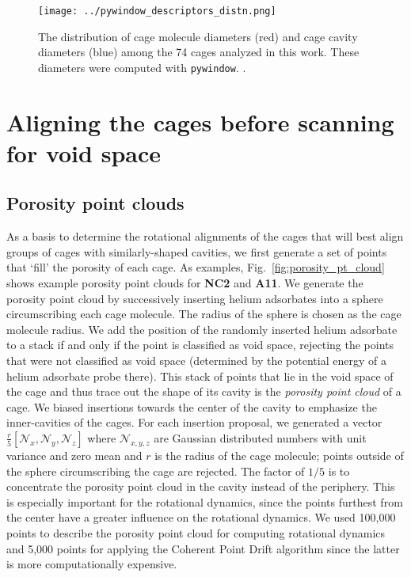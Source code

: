 \documentclass[journal=jacsat,manuscript=article]{achemso}
\begin{document}
\begin{figure}
\centering
	\texttt{[image: ../pywindow\_descriptors\_distn.png]}
	\caption{The distribution of cage molecule diameters (red) and cage cavity diameters (blue) among the 74 cages analyzed in this work. These diameters were computed with \texttt{pywindow}. \cite{miklitz2018pywindow}.
	} \label{fig:pywindow_descriptors_distn}
\end{figure}

\newpage
\clearpage

\section{Aligning the cages before scanning for void space} 

{\color{red}
\subsection{Porosity point clouds}
\label{sec:porosity_pt_cld}
As a basis to determine the rotational alignments of the cages that will best align groups of cages with similarly-shaped cavities, we first generate a set of points that `fill' the porosity of each cage. As examples, Fig.~\ref{fig:porosity_pt_cloud} shows example porosity point clouds for \textbf{NC2} and \textbf{A11}. We generate the porosity point cloud by successively inserting helium adsorbates into a sphere circumscribing each cage molecule. The radius of the sphere is chosen as the cage molecule radius. We add the position of the randomly inserted helium adsorbate to a stack if and only if the point is classified as void space, rejecting the points that were not classified as void space (determined by the potential energy of a helium adsorbate probe there). This stack of points that lie in the void space of the cage and thus trace out the shape of its cavity is the \emph{porosity point cloud} of a cage. We biased insertions towards the center of the cavity to emphasize the inner-cavities of the cages. For each insertion proposal, we generated a vector $\frac{r}{5}[\mathcal{N}_x,\mathcal{N}_y,\mathcal{N}_z]$ where $\mathcal{N}_{x,y,z}$ are Gaussian distributed numbers with unit variance and zero mean and $r$ is the radius of the cage molecule; points outside of the sphere circumscribing the cage are rejected. The factor of $1/5$ is to concentrate the porosity point cloud in the cavity instead of the periphery. This is especially important for the rotational dynamics, since the points furthest from the center have a greater influence on the rotational dynamics. We used 100,000 points to describe the porosity point cloud for computing rotational dynamics and 5,000 points for applying the Coherent Point Drift algorithm since the latter is more computationally expensive.

}
\end{document}
